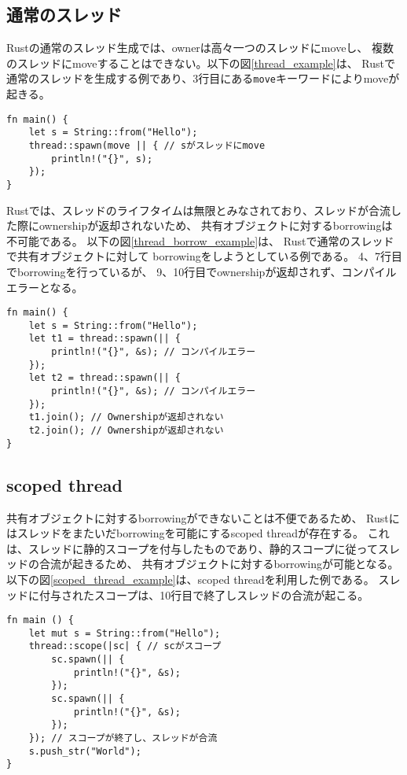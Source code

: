 \documentclass{sumiilab-paper}
\theoremstyle{mystyle}
\numberwithin{definition}{chapter} %
\begin{document}
\subsection{通常のスレッド}
Rustの通常のスレッド生成では、ownerは高々一つのスレッドにmoveし、
複数のスレッドにmoveすることはできない。以下の図\ref{thread_example}は、
Rustで通常のスレッドを生成する例であり、3行目にある\texttt{move}キーワードによりmoveが起きる。
\begin{lstlisting}[caption=Rustでの通常のスレッド生成の例, 
  label=thread_example, captionpos=b]
fn main() {
    let s = String::from("Hello");
    thread::spawn(move || { // sがスレッドにmove
        println!("{}", s);
    });
}
\end{lstlisting}

Rustでは、スレッドのライフタイムは無限とみなされており、スレッドが合流した際にownershipが返却されないため、
共有オブジェクトに対するborrowingは不可能である。
以下の図\ref{thread_borrow_example}は、
Rustで通常のスレッドで共有オブジェクトに対して
borrowingをしようとしている例である。
4、7行目でborrowingを行っているが、
9、10行目でownershipが返却されず、コンパイルエラーとなる。
\begin{lstlisting}[caption=通常のスレッドでborrowingができない例, 
  label=thread_borrow_example, captionpos=b]
fn main() {
    let s = String::from("Hello");
    let t1 = thread::spawn(|| {
        println!("{}", &s); // コンパイルエラー
    });
    let t2 = thread::spawn(|| {
        println!("{}", &s); // コンパイルエラー
    });
    t1.join(); // Ownershipが返却されない
    t2.join(); // Ownershipが返却されない
}
\end{lstlisting}

\subsection{scoped thread}
共有オブジェクトに対するborrowingができないことは不便であるため、
Rustにはスレッドをまたいだborrowingを可能にするscoped threadが存在する。
これは、スレッドに静的スコープを付与したものであり、静的スコープに従ってスレッドの合流が起きるため、
共有オブジェクトに対するborrowingが可能となる。
以下の図\ref{scoped_thread_example}は、scoped threadを利用した例である。
スレッドに付与されたスコープは、10行目で終了しスレッドの合流が起こる。
\begin{lstlisting}[caption=scoped threadの例, label=scoped_thread_example, captionpos=b]
fn main () {
    let mut s = String::from("Hello");
    thread::scope(|sc| { // scがスコープ
        sc.spawn(|| {
            println!("{}", &s);
        });
        sc.spawn(|| {
            println!("{}", &s);
        });
    }); // スコープが終了し、スレッドが合流
    s.push_str("World");
}
\end{lstlisting}
\end{document}
